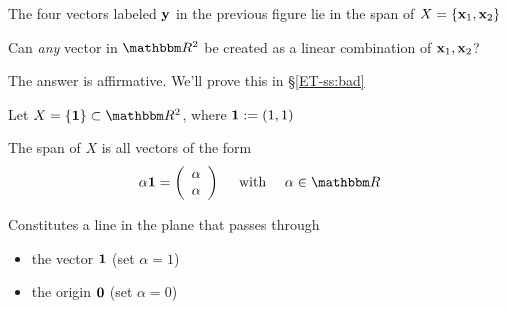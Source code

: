 \begin{frame}

    \vspace{2em}
    \Eg
    The four vectors labeled ${\mathbf y}$ 
    in the previous figure  lie
    in the span of $X = \{{\mathbf x}_1, {\mathbf x}_2\}$
    
    \vspace{.7em}
    Can \emph{any} vector in $\RR^2$ be created as a
    linear combination of ${\mathbf x}_1, {\mathbf x}_2$?  
    
    The answer is affirmative. 
    We'll prove this in \S\ref{ET-ss:bad}
    
\end{frame}



\begin{frame}
    
    \vspace{2em}
    \Eg
    Let $X = \{ \boldone \} \subset \RR^2$, where ${\mathbf 1} := (1,1)$  
    
    The span of $X$ is all vectors of the form 
    \[
    \alpha \boldone 
    =
    \left(
    \begin{array}{c}
        \alpha \\
        \alpha
    \end{array}
    \right)
    \quad \text{ with } \quad \alpha \in \RR  
    \]
   
    \vspace{2em}
    Constitutes a line in the plane that passes through
    \begin{itemize}
        \item the vector ${\mathbf 1}$  (set $\alpha = 1$)
        \item the origin ${\mathbf 0}$ (set $\alpha = 0$)
    \end{itemize}

\end{frame}

